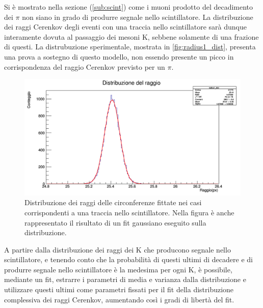 \documentclass[8pt]{extarticle}
\begin{document}
Si è mostrato nella sezione (\ref{sub:scint}) come i muoni prodotto del decadimento dei $\pi$ non siano in grado di produrre segnale nello scintillatore. La distribuzione dei raggi Cerenkov degli eventi con una traccia nello scintillatore sarà dunque interamente dovuta al passaggio dei mesoni K, sebbene solamente di una frazione di questi. La distrubuzione sperimentale, mostrata in \ref{fig:radius1_dist}, presenta una prova a sostegno di questo modello, non essendo presente un picco in corrispondenza del raggio Cerenkov previsto per un $\pi$. \\

\begin{figure}
\begin{center}
\includegraphics[scale=0.4]{radius1_dist}
\caption{Distribuzione dei raggi delle circonferenze fittate nei casi corrispondenti a una traccia nello scintillatore. Nella figura è anche rappresentato il risultato di un fit gaussiano eseguito sulla distribuzione.}
\label{radius1_dist}
\end{center}
\end{figure}

A partire dalla distribuzione dei raggi dei K che producono segnale nello scintillatore, e tenendo conto che la probabilità di questi ultimi di decadere e di produrre segnale nello scintillatore è la medesima per ogni K, è possibile, mediante un fit, estrarre i parametri di media e varianza dalla distribuzione e utilizzare questi ultimi come parametri fissati per il fit della distribuzione complessiva dei raggi Cerenkov, aumentando così i gradi di libertà del fit. \\
\end{document}
